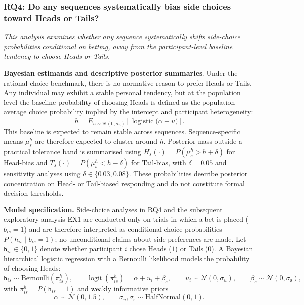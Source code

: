 \documentclass[11pt,a4paper]{article}
\numberwithin{equation}{section}
\begin{document}

\subsubsection{RQ4: Do any sequences systematically bias side choices toward Heads or Tails?}
\label{Sec:Rq4}

\textit{This analysis examines whether any sequence systematically shifts side-choice probabilities conditional on betting, away from the participant-level baseline tendency to choose Heads or Tails.}
	
\textbf{Bayesian estimands and descriptive posterior summaries.}
Under the rational-choice benchmark, there is no normative reason to prefer Heads or Tails.
Any individual may exhibit a stable personal tendency, but at the population level the
baseline probability of choosing Heads is defined as the population-average choice
probability implied by the intercept and participant heterogeneity:
\[
\bar{h}
= E_{u \sim \mathcal N(0,\sigma_u)}
\!\left[\operatorname{logistic}\!\big(\alpha + u\big)\right].
\]
This baseline is expected to remain stable across sequences. Sequence-specific means
$\mu_s^{h}$ are therefore expected to cluster around $\bar{h}$. Posterior mass outside
a practical tolerance band is summarised using
$H_s(\cdot) = P(\mu_s^{h} > \bar{h} + \delta)$ for Head-bias and
$T_s(\cdot) = P(\mu_s^{h} < \bar{h} - \delta)$ for Tail-bias,
with $\delta = 0.05$ and sensitivity analyses using $\delta \in \{0.03,0.08\}$.
These probabilities describe posterior concentration on Head- or Tail-biased responding
and do not constitute formal decision thresholds.

\textbf{Model specification.}
Side-choice analyses in RQ4 and the subsequent exploratory analysis EX1 are
conducted only on trials in which a bet is placed ($b_{is}=1$) and are therefore
interpreted as conditional choice probabilities $P(h_{is} \mid b_{is}=1)$; no
unconditional claims about side preferences are made.
Let $\texttt{h}_{is} \in \{0,1\}$ denote whether participant $i$ chose Heads ($1$) or Tails ($0$).
A Bayesian hierarchical logistic regression with a Bernoulli likelihood models the probability of 
choosing Heads:
\[
\texttt{h}_{is} \sim \mathrm{Bernoulli}(\pi_{is}^{h}), \qquad
\operatorname{logit}(\pi_{is}^{h}) = \alpha + u_i + \beta_s,
\qquad
u_i \sim \mathcal{N}(0,\sigma_u), \qquad
\beta_s \sim \mathcal{N}(0,\sigma_{\mathrm{s}}),
\]
with $\pi_{is}^{h} = P(\texttt{h}_{is}=1)$ and weakly informative priors
\[
\alpha \sim \mathcal{N}(0,1.5), 
\qquad
\sigma_u, \sigma_{\mathrm{s}} \sim \mathrm{HalfNormal}(0,1).
\]
\end{document}
